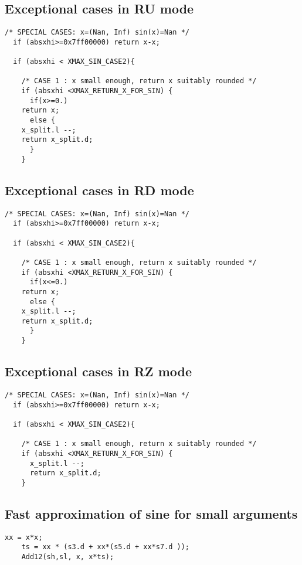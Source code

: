 \subsection{Exceptional cases in RU mode}
\begin{lstlisting}[caption={Exceptional cases for sine RU},firstnumber=1]
  /* SPECIAL CASES: x=(Nan, Inf) sin(x)=Nan */
  if (absxhi>=0x7ff00000) return x-x;

  if (absxhi < XMAX_SIN_CASE2){

    /* CASE 1 : x small enough, return x suitably rounded */
    if (absxhi <XMAX_RETURN_X_FOR_SIN) {
      if(x>=0.)
	return x;
      else {
	x_split.l --;
	return x_split.d;
      }
    }
\end{lstlisting}
\subsection{Exceptional cases in RD mode}
\begin{lstlisting}[caption={Exceptional cases for sine RD},firstnumber=1]
  /* SPECIAL CASES: x=(Nan, Inf) sin(x)=Nan */
  if (absxhi>=0x7ff00000) return x-x;

  if (absxhi < XMAX_SIN_CASE2){

    /* CASE 1 : x small enough, return x suitably rounded */
    if (absxhi <XMAX_RETURN_X_FOR_SIN) {
      if(x<=0.)
	return x;
      else {
	x_split.l --;
	return x_split.d;
      }
    }
\end{lstlisting}
\subsection{Exceptional cases in RZ mode}
\begin{lstlisting}[caption={Exceptional cases for sine RZ},firstnumber=1]
  /* SPECIAL CASES: x=(Nan, Inf) sin(x)=Nan */
  if (absxhi>=0x7ff00000) return x-x;

  if (absxhi < XMAX_SIN_CASE2){

    /* CASE 1 : x small enough, return x suitably rounded */
    if (absxhi <XMAX_RETURN_X_FOR_SIN) {
      x_split.l --;
      return x_split.d;
    }
\end{lstlisting}


\subsection{Fast approximation of sine for small arguments \label{sec:trigo:fastsine}}

\begin{lstlisting}[caption={Sine, case 2},firstnumber=1]
    xx = x*x;
    ts = xx * (s3.d + xx*(s5.d + xx*s7.d ));
    Add12(sh,sl, x, x*ts);
\end{lstlisting}

